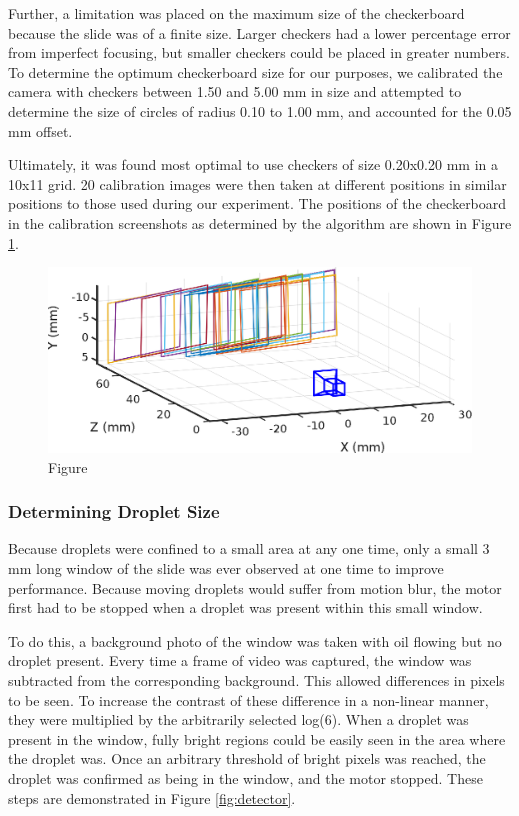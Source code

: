 \documentclass{physics_article_B}
\begin{document}
            Further, a limitation was placed on the maximum size of the checkerboard because the slide was of a finite size. Larger checkers had a lower percentage error from imperfect focusing, but smaller checkers could be placed in greater numbers. To determine the optimum checkerboard size for our purposes, we calibrated the camera with checkers between 1.50 and 5.00 mm in size and attempted to determine the size of circles of radius 0.10 to 1.00 mm, and accounted for the 0.05 mm offset. 
            
            Ultimately, it was found most optimal to use checkers of size 0.20x0.20 mm in a 10x11 grid. 20 calibration images were then taken at different positions in similar positions to those used during our experiment. The positions of the checkerboard in the calibration screenshots as determined by the algorithm are shown in Figure \ref{fig:calib}.
            
                \begin{figure}[H]
                    \centering\includegraphics{Figures/CameraExtrinsics.eps}
                    \caption{Figure }\label{fig:calib}
                \end{figure}
            
        \subsubsection{Determining Droplet Size\label{sect:method:vision:size}}
                
                Because droplets were confined to a small area at any one time, only a small 3 mm long window of the slide was ever observed at one time to improve performance. Because moving droplets would suffer from motion blur, the motor first had to be stopped when a droplet was present within this small window. 
                
                To do this, a background photo of the window was  taken with oil flowing but no droplet present. Every time a frame of video was captured, the window was subtracted from the corresponding background. This allowed differences in pixels to be seen. To increase the contrast of these difference in a non-linear manner, they were multiplied by the arbitrarily selected log(6). When a droplet was present in the window, fully bright regions could be easily seen in the area where the droplet was. Once an arbitrary threshold of bright pixels was reached, the droplet was confirmed as being in the window, and the motor stopped. These steps are demonstrated in Figure \ref{fig:detector}.
            
\end{document}
